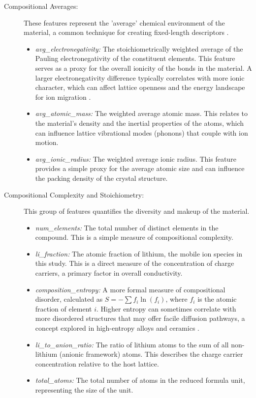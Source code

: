 \begin{description}
    \item[Compositional Averages:] These features represent the 'average' chemical environment of the material, a common technique for creating fixed-length descriptors \cite{Ward2016}.
    \begin{itemize}
        \item \textit{avg\_electronegativity:} The stoichiometrically weighted average of the Pauling electronegativity of the constituent elements. This feature serves as a proxy for the overall ionicity of the bonds in the material. A larger electronegativity difference typically correlates with more ionic character, which can affect lattice openness and the energy landscape for ion migration \cite{Ghosh2019}.
        \item \textit{avg\_atomic\_mass:} The weighted average atomic mass. This relates to the material's density and the inertial properties of the atoms, which can influence lattice vibrational modes (phonons) that couple with ion motion.
        \item \textit{avg\_ionic\_radius:} The weighted average ionic radius. This feature provides a simple proxy for the average atomic size and can influence the packing density of the crystal structure.
    \end{itemize}

    \item[Compositional Complexity and Stoichiometry:] This group of features quantifies the diversity and makeup of the material.
    \begin{itemize}
        \item \textit{num\_elements:} The total number of distinct elements in the compound. This is a simple measure of compositional complexity.
        \item \textit{li\_fraction:} The atomic fraction of lithium, the mobile ion species in this study. This is a direct measure of the concentration of charge carriers, a primary factor in overall conductivity.
        \item \textit{composition\_entropy:} A more formal measure of compositional disorder, calculated as \( S = -\sum f_i \ln(f_i) \), where \(f_i\) is the atomic fraction of element \(i\). Higher entropy can sometimes correlate with more disordered structures that may offer facile diffusion pathways, a concept explored in high-entropy alloys and ceramics \cite{Toda-Caraballo2017}.
        \item \textit{li\_to\_anion\_ratio:} The ratio of lithium atoms to the sum of all non-lithium (anionic framework) atoms. This describes the charge carrier concentration relative to the host lattice.
        \item \textit{total\_atoms:} The total number of atoms in the reduced formula unit, representing the size of the unit.
    \end{itemize}


\end{description}
